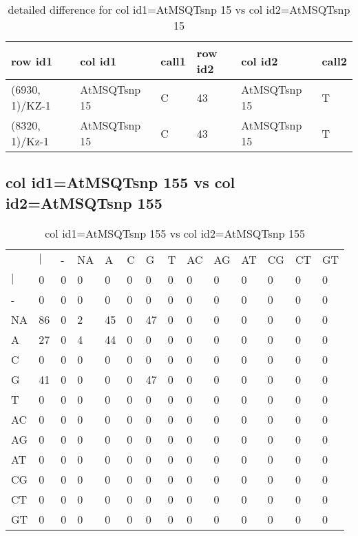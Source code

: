 \begin{center}
\begin{longtable}{|l|l|l|l|l|l|}
\caption{detailed difference for col id1=AtMSQTsnp 15 vs col id2=AtMSQTsnp 15} \label{table_dm733}\\
\hline
row id1&col id1&call1&row id2&col id2&call2\\
\hline
(6930, 1)/KZ-1&AtMSQTsnp 15&C&43&AtMSQTsnp 15&T\\
(8320, 1)/Kz-1&AtMSQTsnp 15&C&43&AtMSQTsnp 15&T\\
\hline
\end{longtable}
\end{center}

\subsection{col id1=AtMSQTsnp 155 vs col id2=AtMSQTsnp 155}
\begin{center}
\begin{longtable}{|l|l|l|l|l|l|l|l|l|l|l|l|l|l|}
\caption{col id1=AtMSQTsnp 155 vs col id2=AtMSQTsnp 155} \label{table_dm734}\\
\hline
\\
\hline
&$|$&-&NA&A&C&G&T&AC&AG&AT&CG&CT&GT\\
$|$&0&0&0&0&0&0&0&0&0&0&0&0&0\\
-&0&0&0&0&0&0&0&0&0&0&0&0&0\\
NA&86&0&2&45&0&47&0&0&0&0&0&0&0\\
A&27&0&4&44&0&0&0&0&0&0&0&0&0\\
C&0&0&0&0&0&0&0&0&0&0&0&0&0\\
G&41&0&0&0&0&47&0&0&0&0&0&0&0\\
T&0&0&0&0&0&0&0&0&0&0&0&0&0\\
AC&0&0&0&0&0&0&0&0&0&0&0&0&0\\
AG&0&0&0&0&0&0&0&0&0&0&0&0&0\\
AT&0&0&0&0&0&0&0&0&0&0&0&0&0\\
CG&0&0&0&0&0&0&0&0&0&0&0&0&0\\
CT&0&0&0&0&0&0&0&0&0&0&0&0&0\\
GT&0&0&0&0&0&0&0&0&0&0&0&0&0\\
\hline
\end{longtable}
\end{center}

